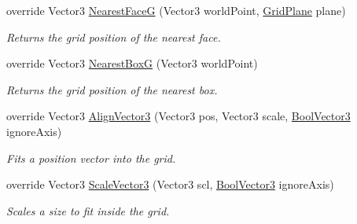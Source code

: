 \begin{DoxyCompactItemize}
override Vector3 \hyperlink{class_g_f_rect_grid_aeda4f7e218bf92e1cc1361913569fabb_aeda4f7e218bf92e1cc1361913569fabb}{Nearest\+Face\+G} (Vector3 world\+Point, \hyperlink{namespace_grid_framework_aa55de93079e09bd55c4cb660025820d5_aa55de93079e09bd55c4cb660025820d5}{Grid\+Plane} plane)
\begin{DoxyCompactList}\small\item\em Returns the grid position of the nearest face.\end{DoxyCompactList}\item 
override Vector3 \hyperlink{class_g_f_rect_grid_a97bcb6df6296fac0bcf92c9d8908df00_a97bcb6df6296fac0bcf92c9d8908df00}{Nearest\+Box\+G} (Vector3 world\+Point)
\begin{DoxyCompactList}\small\item\em Returns the grid position of the nearest box.\end{DoxyCompactList}\item 
override Vector3 \hyperlink{class_g_f_rect_grid_a26011b42493622436cd9a86516b82687_a26011b42493622436cd9a86516b82687}{Align\+Vector3} (Vector3 pos, Vector3 scale, \hyperlink{class_grid_framework_1_1_vectors_1_1_bool_vector3}{Bool\+Vector3} ignore\+Axis)
\begin{DoxyCompactList}\small\item\em Fits a position vector into the grid.\end{DoxyCompactList}\item 
override Vector3 \hyperlink{class_g_f_rect_grid_a31346980b7fc37aea46e750958c67963_a31346980b7fc37aea46e750958c67963}{Scale\+Vector3} (Vector3 scl, \hyperlink{class_grid_framework_1_1_vectors_1_1_bool_vector3}{Bool\+Vector3} ignore\+Axis)
\begin{DoxyCompactList}\small\item\em Scales a size to fit inside the grid.\end{DoxyCompactList}\end{DoxyCompactItemize}
